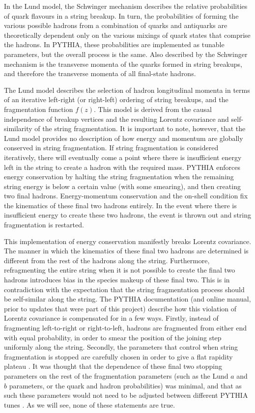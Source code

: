 \documentclass[12pt,a4paper]{report}
\begin{document}
In the Lund model, the Schwinger mechanism describes the relative probabilities of quark flavours in a string breakup. In turn, the probabilities of forming the various possible hadrons from a combination of quarks and antiquarks are theoretically dependent only on the various mixings of quark states that comprise the hadrons. In PYTHIA, these probabilities are implemented as tunable parameters, but the overall process is the same. Also described by the Schwinger mechanism is the transverse momenta of the quarks formed in string breakups, and therefore the transverse momenta of all final-state hadrons.

The Lund model describes the selection of hadron longitudinal momenta in terms of an iterative left-right (or right-left) ordering of string breakups, and the fragmentation function $f(z)$. This model is derived from the causal independence of breakup vertices and the resulting Lorentz covariance and self-similarity of the string fragmentation. It is important to note, however, that the Lund model provides no description of how energy and momentum are globally conserved in string fragmentation. If string fragmentation is considered iteratively, there will eventually come a point where there is insufficient energy left in the string to create a hadron with the required mass. PYTHIA enforces energy conservation by halting the string fragmentation when the remaining string energy is below a certain value (with some smearing), and then creating two final hadrons. Energy-momentum conservation and the on-shell condition fix the kinematics of these final two hadrons entirely. In the event where there is insufficient energy to create these two hadrons, the event is thrown out and string fragmentation is restarted.

This implementation of energy conservation manifestly breaks Lorentz covariance. The manner in which the kinematics of these final two hadrons are determined is different from the rest of the hadrons along the string. Furthermore, refragmenting the entire string when it is not possible to create the final two hadrons introduces bias in the species makeup of these final two. This is in contradiction with the expectation that the string fragmentation process should be self-similar along the string. The PYTHIA documentation (and online manual, prior to updates that were part of this project) describe how this violation of Lorentz covariance is compensated for in a few ways. Firstly, instead of fragmenting left-to-right or right-to-left, hadrons are fragmented from either end with equal probability, in order to smear the position of the joining step uniformly along the string. Secondly, the parameters that control when string fragmentation is stopped are carefully chosen in order to give a flat rapidity plateau \cite{Bierlich:2022pfr,Sjostrand:2006za}. It was thought that the dependence of these final two stopping parameters on the rest of the fragmentation parameters (such as the Lund $a$ and $b$ parameters, or the quark and hadron probabilities) was minimal, and that as such these parameters would not need to be adjusted between different PYTHIA tunes \cite{PYTHIAmanualold}. As we will see, none of these statements are true.
\end{document}
